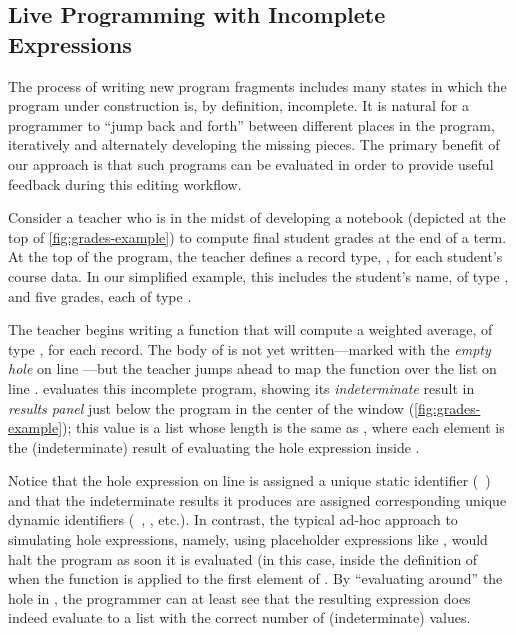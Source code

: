 \subsection{Live Programming with Incomplete Expressions}

The process of writing new program fragments includes many states in which the
program under construction is, by definition, incomplete.
%
It is natural for a programmer to ``jump back and forth'' between different
places in the program, iteratively and alternately developing the missing
pieces.
%
The primary benefit of our approach is that such programs can be evaluated in
order to provide useful feedback during this editing workflow.



%
Consider a teacher who is in the midst of developing a \Hazel{} notebook
(depicted at the top of \autoref{fig:grades-example}) to compute final student
grades at the end of a term.
%
At the top of the program, the teacher defines a
record type, , for each student's course data.
%
In our simplified example, this includes the student's name, of type
, and five grades, each of type .

The teacher begins writing a  function that will
compute a weighted average, of type , for each 
record.
%
The body of  is not yet written---marked with the
\emph{empty hole} on line ---but the teacher jumps ahead to map the
function over the  list on line .
%
\Hazel{} evaluates this incomplete program, showing its
\emph{indeterminate} result in \emph{results panel} just below the
program in the center of the window (\autoref{fig:grades-example});
this value is a list whose length is the same as
, where each element is the (indeterminate) result of evaluating the
hole expression inside .
%

Notice that the hole expression on line  is assigned a unique static
identifier (\ie{}~) and that the indeterminate results it produces are
assigned corresponding unique dynamic identifiers (\ie{}~, ,
etc.).
%
In contrast, the typical ad-hoc approach to simulating hole expressions, namely,
using placeholder expressions like , would halt
the program as soon it is evaluated (in this case, inside the definition of
 when the function is applied to the first element of .
%
By ``evaluating around'' the hole in \HazelnutLive{}, the programmer can at
least see that the resulting expression does indeed evaluate to a list with the
correct number of (indeterminate) values.

